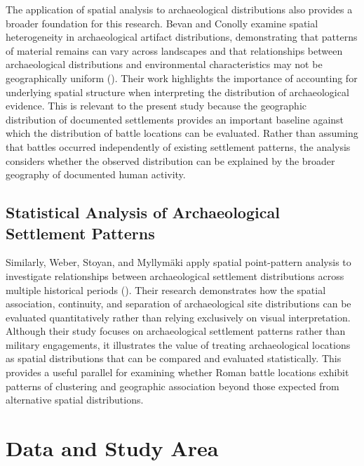\documentclass[
  letterpaper,
  DIV=11,
  numbers=noendperiod]{scrartcl}
\begin{document}
The application of spatial analysis to archaeological distributions also
provides a broader foundation for this research. Bevan and Conolly
examine spatial heterogeneity in archaeological artifact distributions,
demonstrating that patterns of material remains can vary across
landscapes and that relationships between archaeological distributions
and environmental characteristics may not be geographically uniform
(). Their work
highlights the importance of accounting for underlying spatial structure
when interpreting the distribution of archaeological evidence. This is
relevant to the present study because the geographic distribution of
documented settlements provides an important baseline against which the
distribution of battle locations can be evaluated. Rather than assuming
that battles occurred independently of existing settlement patterns, the
analysis considers whether the observed distribution can be explained by
the broader geography of documented human activity.

\subsection{Statistical Analysis of Archaeological Settlement
Patterns}\label{statistical-analysis-of-archaeological-settlement-patterns}

Similarly, Weber, Stoyan, and Myllymäki apply spatial point-pattern
analysis to investigate relationships between archaeological settlement
distributions across multiple historical periods
(). Their research demonstrates how the spatial association,
continuity, and separation of archaeological site distributions can be
evaluated quantitatively rather than relying exclusively on visual
interpretation. Although their study focuses on archaeological
settlement patterns rather than military engagements, it illustrates the
value of treating archaeological locations as spatial distributions that
can be compared and evaluated statistically. This provides a useful
parallel for examining whether Roman battle locations exhibit patterns
of clustering and geographic association beyond those expected from
alternative spatial distributions.

\section{Data and Study Area}\label{data-and-study-area}
\end{document}
